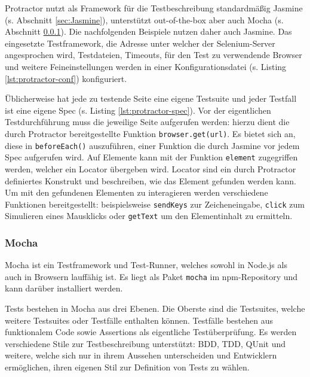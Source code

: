 Protractor nutzt als Framework für die Testbeschreibung standardmäßig Jasmine (s. Abschnitt \ref{sec:Jasmine}), unterstützt out-of-the-box aber auch Mocha (s. Abschnitt \ref{sec:Mocha}). Die nachfolgenden Beispiele nutzen daher auch Jasmine. Das eingesetzte Testframework, die Adresse unter welcher der Selenium-Server angesprochen wird, Testdateien, Timeouts, für den Test zu verwendende Browser und weitere Feineinstellungen werden in einer Konfigurationsdatei (s. Listing \ref{lst:protractor-conf}) konfiguriert.

\begin{figure}[H]
	
\end{figure}

Üblicherweise hat jede zu testende Seite eine eigene Testsuite und jeder Testfall ist eine eigene Spec (s. Listing \ref{lst:protractor-spec}). Vor der eigentlichen Testdurchführung muss die jeweilige Seite aufgerufen werden: hierzu dient die durch Protractor bereitgestellte Funktion \texttt{browser.get(url)}. Es bietet sich an, diese in \texttt{beforeEach()} auszuführen, einer Funktion die durch Jasmine vor jedem Spec aufgerufen wird. Auf Elemente kann mit der Funktion \texttt{element} zugegriffen werden, welcher ein Locator übergeben wird. Locator sind ein durch Protractor definiertes Konstrukt und beschreiben, wie das Element gefunden werden kann. Um mit den gefundenen Elementen zu interagieren werden verschiedene Funktionen bereitgestellt: beispielsweise \texttt{sendKeys} zur Zeicheneingabe, \texttt{click} zum Simulieren eines Mausklicks oder \texttt{getText} um den Elementinhalt zu ermitteln.

\begin{figure}[H]
	
\end{figure}

\subsubsection{Mocha}
\label{sec:Mocha}
Mocha ist ein Testframework und Test-Runner, welches sowohl in Node.js als auch in Browsern lauffähig ist. Es liegt als Paket \texttt{mocha} im npm-Repository und kann darüber installiert werden.\cite{mocha-index}

Tests bestehen in Mocha aus drei Ebenen. Die Oberste sind die Testsuites, welche weitere Testsuites oder Testfälle enthalten können. Testfälle bestehen aus funktionalem Code sowie Assertions als eigentliche Testüberprüfung. Es werden verschiedene Stile zur Testbeschreibung unterstützt: BDD, TDD, QUnit und weitere, welche sich nur in ihrem Aussehen unterscheiden und Entwicklern ermöglichen, ihren eigenen Stil zur Definition von Tests zu wählen.\cite{mocha-index}

